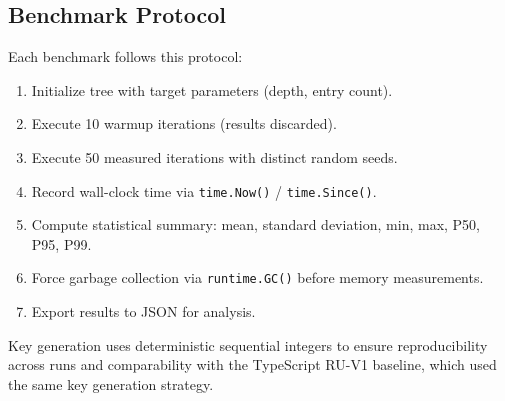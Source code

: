 \subsection{Benchmark Protocol}

Each benchmark follows this protocol:

\begin{enumerate}
  \item Initialize tree with target parameters (depth, entry count).
  \item Execute 10 warmup iterations (results discarded).
  \item Execute 50 measured iterations with distinct random seeds.
  \item Record wall-clock time via \texttt{time.Now()} /
    \texttt{time.Since()}.
  \item Compute statistical summary: mean, standard deviation,
    min, max, P50, P95, P99.
  \item Force garbage collection via \texttt{runtime.GC()} before
    memory measurements.
  \item Export results to JSON for analysis.
\end{enumerate}

Key generation uses deterministic sequential integers to ensure
reproducibility across runs and comparability with the TypeScript
RU-V1 baseline, which used the same key generation strategy.
